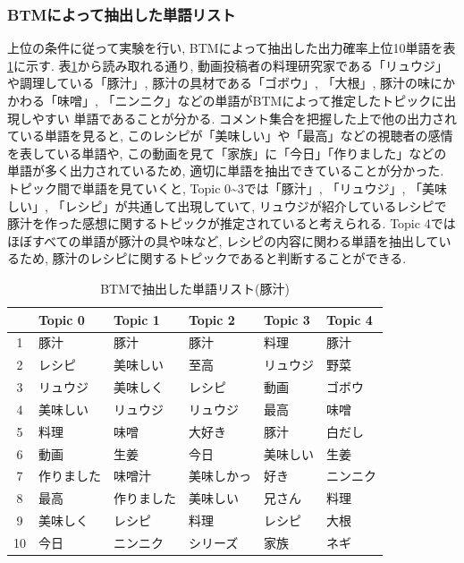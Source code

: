 \documentclass{ltjarticle}
\begin{document}
\subsubsection{BTMによって抽出した単語リスト}
上位の条件に従って実験を行い, BTMによって抽出した出力確率上位10単語を表\ref{table:豚汁単語結果}に示す. 
表\ref{table:豚汁単語結果}から読み取れる通り, 動画投稿者の料理研究家である「リュウジ」や調理している「豚汁」, 
豚汁の具材である「ゴボウ」, 「大根」, 豚汁の味にかかわる「味噌」, 「ニンニク」などの単語がBTMによって推定したトピックに出現しやすい
単語であることが分かる. コメント集合を把握した上で他の出力されている単語を見ると, このレシピが「美味しい」や「最高」などの視聴者の感情
を表している単語や, この動画を見て「家族」に「今日」「作りました」などの単語が多く出力されているため, 適切に単語を抽出できていることが分かった. 
トピック間で単語を見ていくと, Topic 0\sim3では「豚汁」, 「リュウジ」, 「美味しい」, 「レシピ」が共通して出現していて, 
リュウジが紹介しているレシピで豚汁を作った感想に関するトピックが推定されていると考えられる. 
Topic 4ではほぼすべての単語が豚汁の具や味など, レシピの内容に関わる単語を抽出しているため, 豚汁のレシピに関するトピックであると判断することができる. 


\vspace{10truept}

\begin{table}[h]
    \caption{BTMで抽出した単語リスト(豚汁)}
    \vspace{5truept}

    \centering
    \begin{tabular}{|c|>{\centering}p{6em}|>{\centering}p{6em}|>{\centering}p{6em}|>{\centering}p{6em}|>{\centering\arraybackslash}p{6em}|}
        \hline
        & Topic 0 & Topic 1 & Topic 2 & Topic 3 & Topic 4\\
        \hline\hline
        1 & 豚汁 & 豚汁 & 豚汁 & 料理 & 豚汁\\
        \hline
        2 & レシピ & 美味しい & 至高 & リュウジ & 野菜\\
        \hline
        3 & リュウジ & 美味しく & レシピ & 動画 & ゴボウ\\
        \hline
        4 & 美味しい & リュウジ & リュウジ & 最高 & 味噌\\
        \hline
        5 & 料理 & 味噌 & 大好き & 豚汁 & 白だし\\
        \hline
        6 & 動画 & 生姜 & 今日 & 美味しい & 生姜\\
        \hline
        7 & 作りました & 味噌汁 & 美味しかっ & 好き & ニンニク\\
        \hline
        8 & 最高 & 作りました & 美味しい & 兄さん & 料理\\
        \hline
        9 & 美味しく & レシピ & 料理 & レシピ & 大根\\
        \hline
        10 & 今日 & ニンニク & シリーズ & 家族 & ネギ\\
        \hline
    \end{tabular}
    \label{table:豚汁単語結果}
\end{table}
\end{document}
